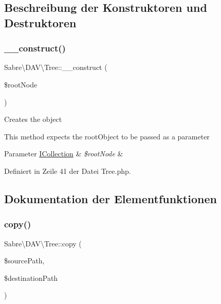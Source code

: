 \subsection{Beschreibung der Konstruktoren und Destruktoren}
\mbox{\label{class_sabre_1_1_d_a_v_1_1_tree_a27f9fc4daf3fe3dcdd53d11f5e00bb9e}} 
\subsubsection{\texorpdfstring{\+\_\+\+\_\+construct()}{\_\_construct()}}
{\footnotesize\ttfamily Sabre\textbackslash{}\+D\+A\+V\textbackslash{}\+Tree\+::\+\_\+\+\_\+construct (\begin{DoxyParamCaption}\item[{\mbox{\hyperlink{interface_sabre_1_1_d_a_v_1_1_i_collection}{I\+Collection}}}]{\$root\+Node }\end{DoxyParamCaption})}

Creates the object

This method expects the root\+Object to be passed as a parameter


\begin{DoxyParams}[1]{Parameter}
\mbox{\hyperlink{interface_sabre_1_1_d_a_v_1_1_i_collection}{I\+Collection}} & {\em \$root\+Node} & \\
\hline
\end{DoxyParams}


Definiert in Zeile 41 der Datei Tree.\+php.



\subsection{Dokumentation der Elementfunktionen}
\mbox{\label{class_sabre_1_1_d_a_v_1_1_tree_a18da66484addb3d663cfb4b96fd558ad}} 
\subsubsection{\texorpdfstring{copy()}{copy()}}
{\footnotesize\ttfamily Sabre\textbackslash{}\+D\+A\+V\textbackslash{}\+Tree\+::copy (\begin{DoxyParamCaption}\item[{}]{\$source\+Path,  }\item[{}]{\$destination\+Path }\end{DoxyParamCaption})}

